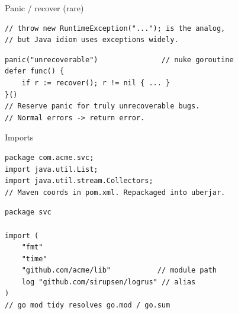 \documentclass[10pt]{article}
\begin{document}
\begin{construct}{Panic / recover (rare)}
\noindent
\begin{minipage}[t]{0.485\linewidth}
\begin{lstlisting}[style=java, title=Java]
// throw new RuntimeException("..."); is the analog,
// but Java idiom uses exceptions widely.
\end{lstlisting}
\end{minipage}\hfill
\begin{minipage}[t]{0.485\linewidth}
\begin{lstlisting}[style=go, title=Go]
panic("unrecoverable")               // nuke goroutine
defer func() {
    if r := recover(); r != nil { ... }
}()
// Reserve panic for truly unrecoverable bugs.
// Normal errors -> return error.
\end{lstlisting}
\end{minipage}
\end{construct}


\begin{construct}{Imports}
\noindent
\begin{minipage}[t]{0.485\linewidth}
\begin{lstlisting}[style=java, title=Java]
package com.acme.svc;
import java.util.List;
import java.util.stream.Collectors;
// Maven coords in pom.xml. Repackaged into uberjar.
\end{lstlisting}
\end{minipage}\hfill
\begin{minipage}[t]{0.485\linewidth}
\begin{lstlisting}[style=go, title=Go]
package svc

import (
    "fmt"
    "time"
    "github.com/acme/lib"           // module path
    log "github.com/sirupsen/logrus" // alias
)
// go mod tidy resolves go.mod / go.sum
\end{lstlisting}
\end{minipage}
\end{construct}

\end{document}
